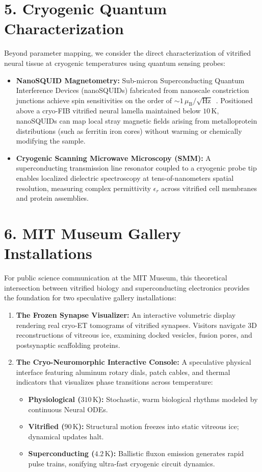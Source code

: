 \documentclass[10pt,twocolumn,letterpaper]{article}
\begin{document}
\section*{5. Cryogenic Quantum Characterization}

Beyond parameter mapping, we consider the direct characterization of vitrified neural tissue at cryogenic temperatures using quantum sensing probes:

\begin{itemize}
  \item \textbf{NanoSQUID Magnetometry:} Sub-micron Superconducting Quantum Interference Devices (nanoSQUIDs) fabricated from nanoscale constriction junctions achieve spin sensitivities on the order of $\sim 1\,\mu_{\text{B}}/\sqrt{\text{Hz}}$~\cite{anahory2020squid}. Positioned above a cryo-FIB vitrified neural lamella maintained below $10\,\text{K}$, nanoSQUIDs can map local stray magnetic fields arising from metalloprotein distributions (such as ferritin iron cores) without warming or chemically modifying the sample.
  \item \textbf{Cryogenic Scanning Microwave Microscopy (SMM):} A superconducting transmission line resonator coupled to a cryogenic probe tip enables localized dielectric spectroscopy at tens-of-nanometers spatial resolution, measuring complex permittivity $\epsilon_r$ across vitrified cell membranes and protein assemblies.
\end{itemize}

\section*{6. MIT Museum Gallery Installations}

For public science communication at the MIT Museum, this theoretical intersection between vitrified biology and superconducting electronics provides the foundation for two speculative gallery installations:

\begin{enumerate}
  \item \textbf{The Frozen Synapse Visualizer:} An interactive volumetric display rendering real cryo-ET tomograms of vitrified synapses. Visitors navigate 3D reconstructions of vitreous ice, examining docked vesicles, fusion pores, and postsynaptic scaffolding proteins.
  \item \textbf{The Cryo-Neuromorphic Interactive Console:} A speculative physical interface featuring aluminum rotary dials, patch cables, and thermal indicators that visualizes phase transitions across temperature:
  \begin{itemize}
    \item \textbf{Physiological ($310\,\text{K}$):} Stochastic, warm biological rhythms modeled by continuous Neural ODEs.
    \item \textbf{Vitrified ($90\,\text{K}$):} Structural motion freezes into static vitreous ice; dynamical updates halt.
    \item \textbf{Superconducting ($4.2\,\text{K}$):} Ballistic fluxon emission generates rapid pulse trains, sonifying ultra-fast cryogenic circuit dynamics.
  \end{itemize}
\end{enumerate}
\end{document}
